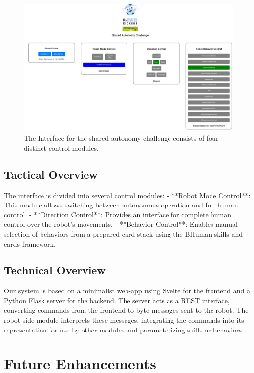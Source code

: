 \documentclass[a4paper]{article}
\begin{document}
\begin{figure}[h]
\centering
\includegraphics[width=\textwidth]{img/SAC}
\caption{The Interface for the shared autonomy challenge consists of four distinct control modules.}
\end{figure}

\subsection{Tactical Overview}

The interface is divided into several control modules:
- **Robot Mode Control**: This module allows switching between autonomous operation and full human control.
- **Direction Control**: Provides an interface for complete human control over the robot's movements.
- **Behavior Control**: Enables manual selection of behaviors from a prepared card stack using the BHuman skills and cards framework.

\newpage
\subsection{Technical Overview}

Our system is based on a minimalist web-app using Svelte for the frontend and a Python Flask server for the backend. The server acts as a REST interface, converting commands from the frontend to byte messages sent to the robot. The robot-side module interprets these messages, integrating the commands into its representation for use by other modules and parameterizing skills or behaviors.

\section{Future Enhancements}
\end{document}
